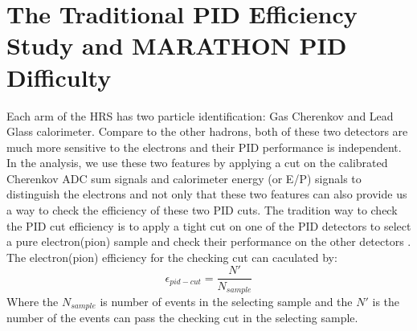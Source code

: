 



\section{The Traditional PID Efficiency Study and MARATHON PID Difficulty}
Each arm of the HRS has two particle identification: Gas Cherenkov and Lead Glass calorimeter. Compare to the other hadrons, both of these two detectors are much more sensitive to the electrons and their PID performance is independent. In the analysis, we use these two features by applying a cut on the calibrated Cherenkov ADC sum signals and calorimeter energy (or E/P) signals to distinguish the electrons and not only that these two features can also provide us a way to check the efficiency of these two PID cuts. The tradition way \cite{pid_eff} to check the PID cut efficiency is to apply a tight cut on one of the PID detectors to select a pure electron(pion) sample and check their performance on the other detectors . The electron(pion) efficiency for the checking cut can caculated by:
\begin{equation}\label{pid_eq1}
\epsilon_{pid-cut}=\dfrac{N'}{N_{sample}}
\end{equation}  
Where the $N_{sample}$ is number of events in the selecting sample and the $N'$ is the number of the events can pass the checking cut in the selecting sample.


